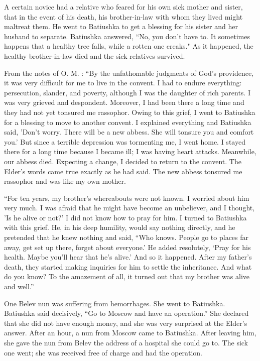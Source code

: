 A certain novice had a relative who feared for his own sick mother and sister, that in the event of his death, his brother-in-law with whom they lived might maltreat them. He went to Batiushka to get a blessing for his sister and her husband to separate. Batiushka answered, “No, you don't have to. It sometimes happens that a healthy tree falls, while a rotten one creaks." As it happened, the healthy brother-in-law died and the sick relatives survived.

From the notes of O. M. : “By the unfathomable judgments of God's providence, it was very difficult for me to live in the convent. I had to endure everything: persecution, slander, and poverty, although I was the daughter of rich parents. I was very grieved and despondent. Moreover, I had been there a long time and they had not yet tonsured me rassophor. Owing to this grief, I went to Batiushka for a blessing to move to another convent. I explained everything and Batiushka said, 'Don't worry. There will be a new abbess. She will tonsure you and comfort you.' But since a terrible depression was tormenting me, I went home. I stayed there for a long time because I became ill; I was having heart attacks. Meanwhile, our abbess died. Expecting a change, I decided to return to the convent. The Elder's words came true exactly as he had said. The new abbess tonsured me rassophor and was like my own mother.

“For ten years, my brother's whereabouts were not known. I worried about him very much. I was afraid that he might have become an unbeliever, and I thought, 'Is he alive or not?' I did not know how to pray for him. I turned to Batiushka with this grief. He, in his deep humility, would say nothing directly, and he pretended that he knew nothing and said, “Who knows. People go to places far away, get set up there, forget about everyone.' He added resolutely, ‘Pray for his health. Maybe you'll hear that he's alive.' And so it happened. After my father's death, they started making inquiries for him to settle the inheritance. And what do you know? To the amazement of all, it turned out that my brother was alive and well.”

One Belev nun was suffering from hemorrhages. She went to Batiushka. Batiushka said decisively, “Go to Moscow and have an operation.” She declared that she did not have enough money, and she was very surprised at the Elder's answer. After an hour, a nun from Moscow came to Batiushka. After leaving him, she gave the nun from Belev the address of a hospital she could go to. The sick one went; she was received free of charge and had the operation.

